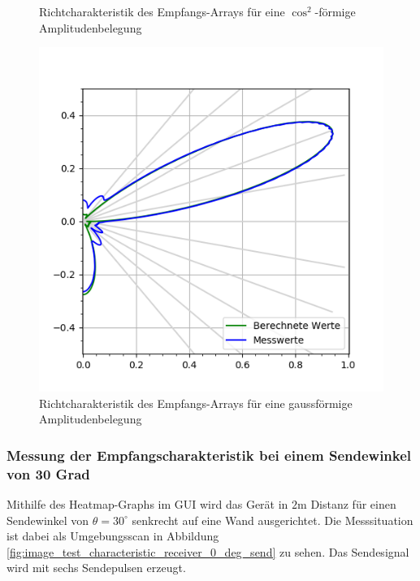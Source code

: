 \begin{figure}[htb]
\begin{minipage}{0.5\textwidth}
\caption{Richtcharakteristik des Empfangs-Arrays für eine $\cos^{2}$-förmige Amplitudenbelegung} %
\label{fig:plot_test_characteristic_receiver_20_deg_send_rect_receive_cos2_4_bursts}
%
\end{minipage}
\begin{minipage}{0.5\textwidth}
\includegraphics[width=\textwidth]{graphics/plot_test_characteristic_receiver_20_deg_send_rect_receive_gauss_4_bursts.png}
\caption{Richtcharakteristik des Empfangs-Arrays für eine gaussförmige Amplitudenbelegung} %
\label{fig:plot_test_characteristic_receiver_20_deg_send_rect_receive_gauss_4_bursts}
%
\end{minipage}
\end{figure}

\clearpage


\subsubsection{Messung der Empfangscharakteristik bei einem Sendewinkel von 30 Grad}
Mithilfe des Heatmap-Graphs im GUI wird das Gerät in $2 \mathrm{m}$ Distanz für einen Sendewinkel von $\theta = 30^{\circ}$ senkrecht auf eine Wand ausgerichtet. Die Messsituation ist dabei als Umgebungsscan in Abbildung \ref{fig:image_test_characteristic_receiver_0_deg_send} zu sehen. Das Sendesignal wird mit sechs Sendepulsen erzeugt.

